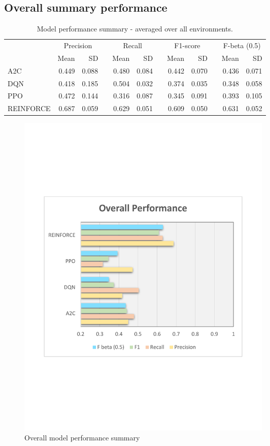 \documentclass[a4paper, 12pt]{article}
\newcommand{\rowspace}[1]{\renewcommand{\arraystretch}{#1}}
\begin{document}
\subsection{Overall summary performance}
\begin{table}[h]\centering
	\sffamily
	\rowspace{1.3}
	\begin{tabular}{@{}l rr c rr c rr c rr@{}}
		\arrayrulecolor{black!40}\toprule
		& \multicolumn{2}{c}{Precision} & \phantom{i} & \multicolumn{2}{c}{Recall} & \phantom{i} & \multicolumn{2}{c}{F1-score} & \phantom{i} & \multicolumn{2}{c}{F-beta (0.5)} \\
		\cmidrule{2-3} \cmidrule{5-6} \cmidrule{8-9} \cmidrule{11-12} 
		
		&Mean &SD & &Mean &SD & &Mean &SD& &Mean & SD\\ \midrule
		
		A2C & 0.449 & 0.088 & &0.480 & 0.084 & & 0.442 & 0.070 & &0.436 &0.071 \\
		DQN & 0.418 & 0.185 & &0.504 & 0.032 & & 0.374 & 0.035 & &0.348 &0.058 \\
		PPO & 0.472 & 0.144 & &0.316 & 0.087 & & 0.345 & 0.091 & &0.393 &0.105 \\
		REINFORCE & 0.687 & 0.059 & &0.629 & 0.051 & & 0.609 & 0.050 & &0.631 &0.052 \\
		
		\bottomrule
	\end{tabular}
	\caption{Model performance summary - averaged over all environments.}
	\label{tbl:OverallSummary}
\end{table}
\begin{figure}[h]
	\centering
	\includegraphics[width=0.6\textwidth, trim={1.5cm 7cm 1cm 7cm}]{images/OverallPlot.pdf}  
	\caption{Overall model performance summary}
	\label{fig:OverallSummary}
\end{figure}
\end{document}

